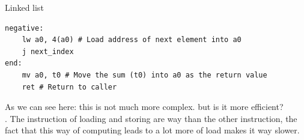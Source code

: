 \begin{parag}{Linked list}
\begin{lstlisting}[language={[RISC-V]Assembler}]
negative:
	lw a0, 4(a0) # Load address of next element into a0
	j next_index
end: 
	mv a0, t0 # Move the sum (t0) into a0 as the return value
	ret # Return to caller
	\end{lstlisting}
	
	As we can see here: this is not much more complex. but is it more efficient?\\
	. The instruction of loading and storing are way  than the other instruction, the fact that this way of computing leads to a lot more of load makes it way slower.
\end{parag}






